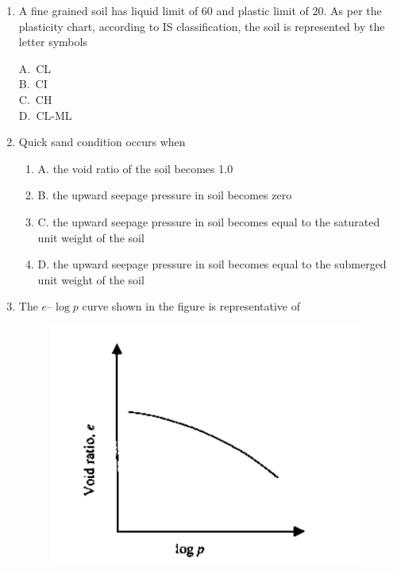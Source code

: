 \documentclass[journal,12pt,onecolumn]{IEEEtran}
\theoremstyle{remark}
\begin{document}
\begin{enumerate}
\noindent\item A fine grained soil has liquid limit of 60 and plastic limit of 20. As per the plasticity chart, according to IS classification, the soil is represented by the letter symbols 
\hfill{}
\begin{multicols}{4}
A.\ CL \\
B.\ CI \\
C.\ CH \\
D.\ CL-ML
\end{multicols}

\noindent\item Quick sand condition occurs when 
\hfill{}


\begin{enumerate}[label=]
 \item A. the void ratio of the soil becomes 1.0 
 \item B. the upward seepage pressure in soil becomes zero 
 \item C. the upward seepage pressure in soil becomes equal to the saturated unit weight of the soil 
 \item D. the upward seepage pressure in soil becomes equal to the submerged unit weight of the soil
 \end{enumerate}


\noindent\item The $e$--$\log p$ curve shown in the figure is representative of 
\hfill{}

\begin{figure}[H]
     \centering
     \includegraphics[scale=0.5]{figs/3e0ddfff-16d6-49d4-a917-0f59027d78f5.jpg} 
     \caption{}
     \label{fig:figure2}
 \end{figure}
    

\end{enumerate}
\end{document}
